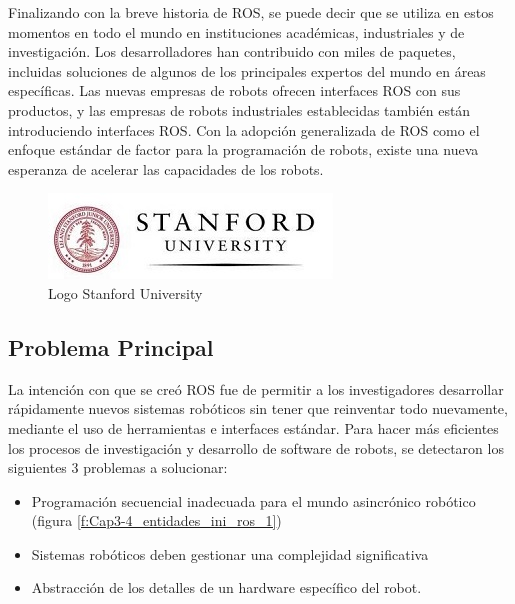         Finalizando con la breve historia de ROS, se puede decir que se utiliza en estos momentos en todo el mundo en instituciones académicas, industriales y de investigación. Los desarrolladores han contribuido con miles de paquetes, incluidas soluciones de algunos de los principales expertos del mundo en áreas específicas. Las nuevas empresas de robots ofrecen interfaces ROS con sus productos, y las empresas de robots industriales establecidas también están introduciendo interfaces ROS. Con la adopción generalizada de ROS como el enfoque estándar de factor para la programación de robots, existe una nueva esperanza de acelerar las capacidades de los robots.
        
        \begin{figure}[htbp]
            \centering
            \includegraphics[width=0.6\linewidth]{Main/Chapter3/Images3/Stanford-University-logo1.jpg}
            \caption{Logo Stanford University \cite{stanford}} 
            \label{f:Cap3-4_entidades_inicio_ros_32}
        \end{figure}

    \newpage

    \subsection{Problema Principal}
    
    La intención con que se creó ROS fue de permitir a los investigadores desarrollar rápidamente nuevos sistemas robóticos sin tener que reinventar todo nuevamente, mediante el uso de herramientas e interfaces estándar. Para hacer más eficientes los procesos de investigación y desarrollo de software de robots, se detectaron los siguientes 3 problemas a solucionar:
    
    \begin{itemize}
        \item {Programación secuencial inadecuada para el mundo asincrónico robótico (figura \eqref{f:Cap3-4_entidades_ini_ros_1})}
        \item {Sistemas robóticos deben gestionar una complejidad significativa}
        \item {Abstracción de los detalles de un hardware específico del robot.}
    \end{itemize}

